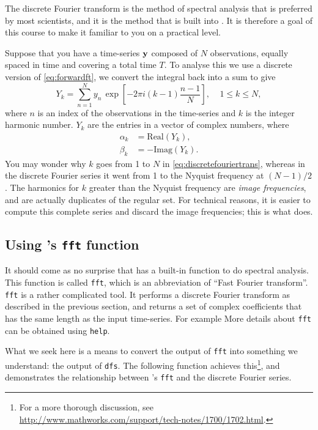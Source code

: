 \documentclass[11pt,twoside,a4paper]{article}
\begin{document}
The discrete Fourier transform is the method of spectral analysis that
is preferred by most scientists, and it is the method that is built
into \Mlab.  It is therefore a goal of this course to make it familiar
to you on a practical level.

Suppose that you have a time-series $\mbox{{\bf y}}$ composed of $N$
observations, equally spaced in time and covering a total time $T$. To
analyse this we use a discrete version of \autoref{eq:forwardft}, we
convert the integral back into a sum to give
\begin{equation}
  \label{eq:discretefouriertrans}
  Y_k = \sum_{n=1}^N y_n\,\exp\left[-2\pi i
    (k-1)\frac{n-1}{N}\right],\;\;\;\; 1\le k \le N,
\end{equation}
where $n$ is an index of the observations in the time-series and $k$
is the integer harmonic number.  $Y_k$ are the entries in a vector of
complex numbers, where
\begin{align}
  \alpha_k &= \text{Real}(Y_k), \\
  \beta_k &= -\text{Imag}(Y_k).
\end{align}
You may wonder why $k$ goes from 1 to $N$ in
\autoref{eq:discretefouriertrans}, whereas in the discrete Fourier series
it went from 1 to the Nyquist frequency at $(N-1)/2$.  The harmonics
for $k$ greater than the Nyquist frequency are \textit{image
  frequencies}, and are actually duplicates of the regular set.  For
technical reasons, it is easier to compute this complete series and
discard the image frequencies; this is what \Mlab does.

\subsection{Using \Mlab's \texttt{fft} function}

It should come as no surprise that \Mlab has a built-in function to do
spectral analysis.  This function is called \texttt{fft}, which is an
abbreviation of ``Fast Fourier transform''. \texttt{fft} is a rather
complicated tool.  It performs a discrete Fourier transform as
described in the previous section, and returns a set of complex
coefficients that has the same length as the input time-series.  For
example  
 More details about \texttt{fft} can be
obtained using \texttt{help}.


What we seek here is a means to convert the output of \texttt{fft}
into something we understand: the output of \texttt{dfs}.  The
following \Mlab function achieves this\footnote{For a more thorough
  discussion, see
  \url{http://www.mathworks.com/support/tech-notes/1700/1702.html}.},
and demonstrates the relationship between \Mlab's \texttt{fft} and the
discrete Fourier series.
\end{document}
